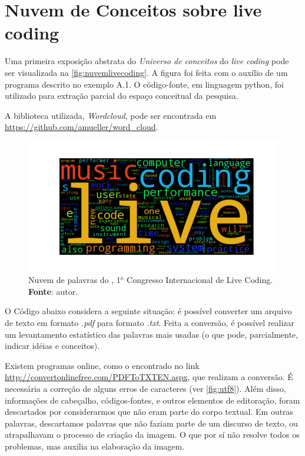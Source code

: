 \chapter{Nuvem de Conceitos sobre live coding}\label{app:A}

Uma primeira exposição abstrata do \emph{Universo de conceitos} do \emph{live coding} pode ser visualizada na \autoref{fig:nuvemlivecoding}. A figura foi feita com o auxílio de um programa descrito no exemplo A.1. O código-fonte, em linguagem python, foi utilizado para extração parcial do espaço conceitual da pesquisa. 

A biblioteca utilizada, \emph{Wordcloud}, pode ser encontrada em \url{https://github.com/amueller/word_cloud}. 

\begin{figure}[!h]
\begin{center}
\centering
\includegraphics[scale=0.8]{./imagens/livecoding_cloud1.png}
\caption{Nuvem de palavras do ,  1$^o$ Congresso Internacional de Live Coding. \textbf{Fonte}: autor.}
\label{fig:nuvemlivecoding}
\end{center}
\end{figure}

O Código abaixo considera a seguinte situação: é possível converter um arquivo de texto em formato \emph{.pdf} para formato \emph{.txt}. Feita a conversão, é possível realizar um levantamento estatístico das palavras mais usadas (o que pode, parcialmente, indicar idéias e conceitos).

 Existem programas online, como o encontrado no link \url{http://convertonlinefree.com/PDFToTXTEN.aspx}, que realizam a conversão. É necessária a correção de alguns erros de caracteres (ver \autoref{fig:utf8}). Além disso, informações de cabeçalho, códigos-fontes, e outros elementos de editoração, foram descartados por considerarmos que não eram parte do corpo textual. Em outras palavras, descartamos palavras que não faziam parte de um discurso de texto, ou atrapalhavam o processo de criação da imagem. O que por sí não resolve todos os problemas, mas auxilia na elaboração da imagem.

